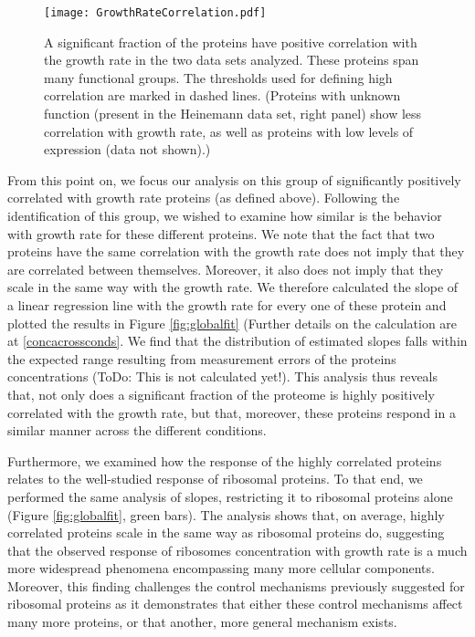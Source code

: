 \documentclass[notitlepage]{article}
\begin{document}
\begin{figure}[h]
\centering
\texttt{[image: GrowthRateCorrelation.pdf]}
\caption{
A significant fraction of the proteins have positive correlation with the growth rate in the two data sets analyzed.
These proteins span many functional groups.
The thresholds used for defining high correlation are marked in dashed lines.
(Proteins with unknown function (present in the Heinemann data set, right panel) show less correlation with growth rate, as well as proteins with low levels of expression (data not shown).)
}
\label{fig:growthcorr}
\end{figure}
From this point on, we focus our analysis on this group of significantly positively correlated with growth rate proteins (as defined above).
Following the identification of this group, we wished to examine how similar is the behavior with growth rate for these different proteins.
We note that the fact that two proteins have the same correlation with the growth rate does not imply that they are correlated between themselves.
Moreover, it also does not imply that they scale in the same way with the growth rate.
We therefore calculated the slope of a linear regression line with the growth rate for every one of these protein and plotted the results in Figure \ref{fig:globalfit} (Further details on the calculation are at \ref{concacrossconds}.
We find that the distribution of estimated slopes falls within the expected range resulting from measurement errors of the proteins concentrations (ToDo: This is not calculated yet!).
This analysis thus reveals that, not only does a significant fraction of the proteome is highly positively correlated with the growth rate, but that, moreover, these proteins respond in a similar manner across the different conditions.

Furthermore, we examined how the response of the highly correlated proteins relates to the well-studied response of ribosomal proteins.
To that end, we performed the same analysis of slopes, restricting it to ribosomal proteins alone (Figure \ref{fig:globalfit}, green bars).
The analysis shows that, on average, highly correlated proteins scale in the same way as ribosomal proteins do, suggesting that the observed response of ribosomes concentration with growth rate is a much more widespread phenomena encompassing many more cellular components.
Moreover, this finding challenges the control mechanisms previously suggested for ribosomal proteins as it demonstrates that either these control mechanisms affect many more proteins, or that another, more general mechanism exists.
\end{document}
